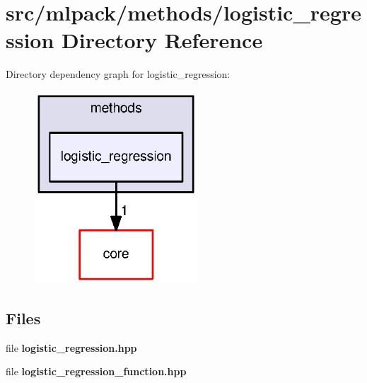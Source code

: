 \section{src/mlpack/methods/logistic\+\_\+regression Directory Reference}
\label{dir_ab5892a8863edef01ef7c478e1f8962d}
Directory dependency graph for logistic\+\_\+regression\+:
\nopagebreak
\begin{figure}[H]
\begin{center}
\leavevmode
\includegraphics[width=174pt]{dir_ab5892a8863edef01ef7c478e1f8962d_dep}
\end{center}
\end{figure}
\subsection*{Files}
\begin{DoxyCompactItemize}
\item 
file {\bf logistic\+\_\+regression.\+hpp}
\item 
file {\bf logistic\+\_\+regression\+\_\+function.\+hpp}
\end{DoxyCompactItemize}
